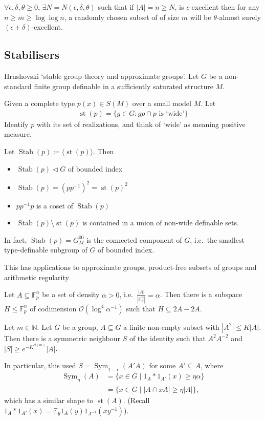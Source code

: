 \documentclass{article}
\DeclareMathOperator{\st}{st}
\DeclareMathOperator{\Stab}{Stab}
\DeclareMathOperator{\Sym}{Sym}
\begin{document}
\begin{ex}
  $\forall \epsilon, \delta, \theta \geq 0$, $\exists N = N(\epsilon,\delta,\theta)$ such that if $|A| = n \geq N$, is $\epsilon$-excellent then for any $n \geq m \geq \log \log n$, a randomly chosen subset of of size $m$ will be $\theta$-almost surely $(\epsilon+\delta)$-excellent.
\end{ex}

\subsection{Stabilisers}
Hrushovski `stable group theory and approximate groups'.
Let $G$ be a non-standard finite group definable in a sufficiently saturated structure $M$.

Given a complete type $p(x) \in S(M)$ over a small model $M$.
Let
\begin{align*}
  \st(p) = \{g \in G : gp \cap p \text{ is `wide'}\}
\end{align*}
Identify $p$ with its set of realizations, and think of `wide' as meaning positive measure.

\begin{thm}
  Let $\Stab(p) \coloneqq \langle \st(p) \rangle$. Then
  \begin{itemize}
    \item $\Stab(p) \lhd G$ of bounded index
    \item $\Stab(p) = (p p^{-1})^2 = \st(p)^2$
    \item $p p^{-1} p$ is a coset of $\Stab(p)$
    \item $\Stab(p) \setminus \st(p)$ is contained in a union of non-wide definable sets.
  \end{itemize}
  In fact, $\Stab(p) = G_M^{00}$ is the connected component of $G$, i.e.\ the smallest type-definable subgroup of $G$ of bounded index.
\end{thm}
This has applications to approximate groups, product-free subsets of groups and arithmetic regularity

\begin{thm}
  Let $A \subseteq \mathbb{F}_p^n$ be a set of density $\alpha > 0$, i.e.\ $\frac{|A|}{|\mathbb{F}_p^n|} = \alpha$.
  Then there is a subspace $H \leq \mathbb{F}_p^n$ of codimension $\mathcal{O}(\log^4 \alpha^{-1})$ such that $H \subseteq 2A - 2A$.
\end{thm}
\begin{thm}[Sanders 2009]
  Let $m \in \mathbb{N}$. Let $G$ be a group, $A \subseteq G$ a finite non-empty subset with $|A^2| \leq K |A|$.
  Then there is a symmetric neighbour $S$ of the identity such that $A^2 A^{-2}$ and $|S| \geq e^{-K^{\mathcal{O}(m)}}|A|$.
\end{thm}
In particular, this used $S = \Sym_{1-\epsilon}(A' A)$ for some $A' \subseteq A$, where
\begin{align*}
  \Sym_\eta(A) &= \{x \in G \mid 1_A * 1_{A'}(x) \geq \eta \alpha\} \\
               &= \{x \in G \mid |A \cap xA| \geq \eta |A|\},
\end{align*}
which has a similar shape to $\st(A)$. (Recall $1_A * 1_{A'}(x) = \mathbb{E}_y 1_A(y) 1_{A^{-1}}(xy^{-1})$).
\end{document}
